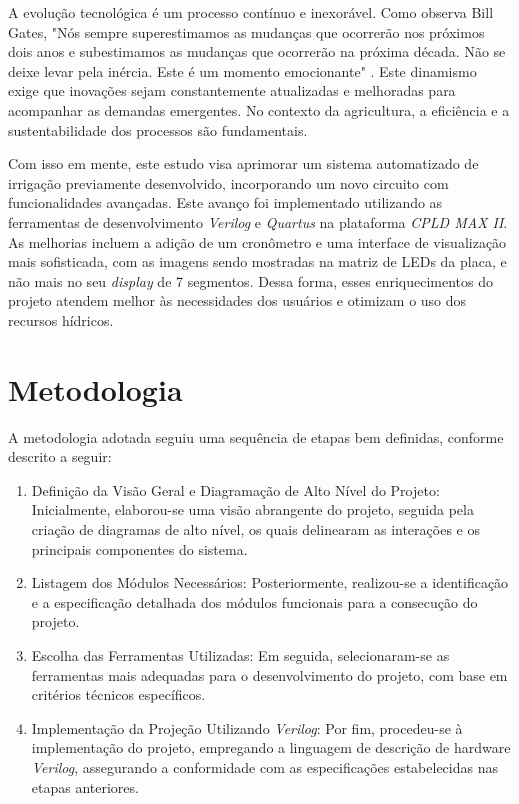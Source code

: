 \documentclass[
	article,			%
	11pt,				%
	oneside,			%
	a4paper,			%
	english,			%
	brazil,				%
	sumario=tradicional
	]{abntex2}
\begin{document}
A evolução tecnológica é um processo contínuo e inexorável. Como observa Bill Gates, "Nós sempre superestimamos as mudanças que ocorrerão nos próximos dois anos e subestimamos as mudanças que ocorrerão na próxima década. Não se deixe levar pela inércia. Este é um momento emocionante"  \cite{gates1995}. Este dinamismo exige que inovações sejam constantemente atualizadas e melhoradas para acompanhar as demandas emergentes. No contexto da agricultura, a eficiência e a sustentabilidade dos processos são fundamentais. 

Com isso em mente, este estudo visa aprimorar um sistema automatizado de irrigação previamente desenvolvido, incorporando um novo circuito com funcionalidades avançadas. Este avanço foi implementado utilizando as ferramentas de desenvolvimento \textit{Verilog} e \textit{Quartus} na plataforma \textit{CPLD MAX II}. As melhorias incluem a adição de um cronômetro e uma interface de visualização mais sofisticada, com as imagens sendo mostradas na matriz de LEDs da placa, e não mais no seu \textit{display} de 7 segmentos. Dessa forma, esses enriquecimentos do projeto atendem melhor às necessidades dos usuários e otimizam o uso dos recursos hídricos.



\section{Metodologia}

A metodologia adotada seguiu uma sequência de etapas bem definidas, conforme descrito a seguir:

\begin{enumerate}
\item Definição da Visão Geral e Diagramação de Alto Nível do Projeto: Inicialmente, elaborou-se uma visão abrangente do projeto, seguida pela criação de diagramas de alto nível, os quais delinearam as interações e os principais componentes do sistema.

\item Listagem dos Módulos Necessários: Posteriormente, realizou-se a identificação e a especificação detalhada dos módulos funcionais para a consecução do projeto.

\item Escolha das Ferramentas Utilizadas: Em seguida, selecionaram-se as ferramentas mais adequadas para o desenvolvimento do projeto, com base em critérios técnicos específicos.

\item Implementação da Projeção Utilizando \textit{Verilog}: Por fim, procedeu-se à implementação do projeto, empregando a linguagem de descrição de hardware \textit{Verilog}, assegurando a conformidade com as especificações estabelecidas nas etapas anteriores.
    
\end{enumerate}
\end{document}
